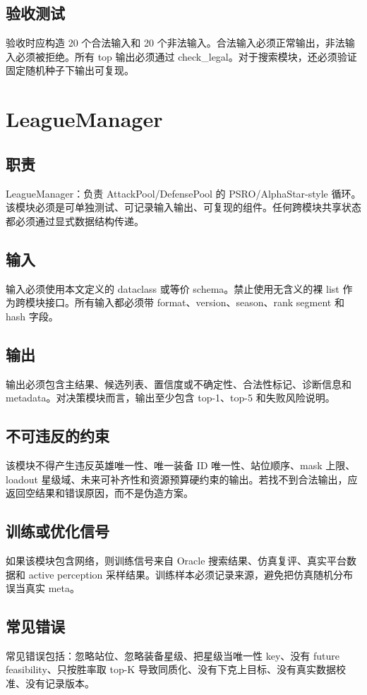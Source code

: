 \documentclass[UTF8,12pt,openany]{ctexbook}
\begin{document}
\subsection{验收测试}
验收时应构造 20 个合法输入和 20 个非法输入。合法输入必须正常输出，非法输入必须被拒绝。所有 top 输出必须通过 check\_legal。对于搜索模块，还必须验证固定随机种子下输出可复现。

\section{LeagueManager}
\subsection{职责}
LeagueManager：负责 AttackPool/DefensePool 的 PSRO/AlphaStar-style 循环。 该模块必须是可单独测试、可记录输入输出、可复现的组件。任何跨模块共享状态都必须通过显式数据结构传递。

\subsection{输入}
输入必须使用本文定义的 dataclass 或等价 schema。禁止使用无含义的裸 list 作为跨模块接口。所有输入都必须带 format、version、season、rank segment 和 hash 字段。

\subsection{输出}
输出必须包含主结果、候选列表、置信度或不确定性、合法性标记、诊断信息和 metadata。对决策模块而言，输出至少包含 top-1、top-5 和失败风险说明。

\subsection{不可违反的约束}
该模块不得产生违反英雄唯一性、唯一装备 ID 唯一性、站位顺序、mask 上限、loadout 星级域、未来可补齐性和资源预算硬约束的输出。若找不到合法输出，应返回空结果和错误原因，而不是伪造方案。

\subsection{训练或优化信号}
如果该模块包含网络，则训练信号来自 Oracle 搜索结果、仿真复评、真实平台数据和 active perception 采样结果。训练样本必须记录来源，避免把仿真随机分布误当真实 meta。

\subsection{常见错误}
常见错误包括：忽略站位、忽略装备星级、把星级当唯一性 key、没有 future feasibility、只按胜率取 top-K 导致同质化、没有下克上目标、没有真实数据校准、没有记录版本。
\end{document}
